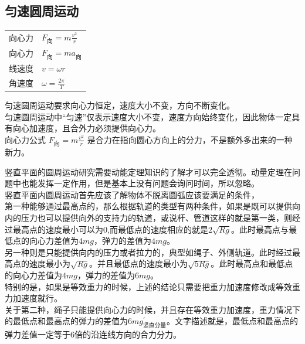 \subsection{匀速圆周运动}
\begin{tabularx}{\columnwidth}{XX}
  向心力 & $F_{\text{向}}=m\frac{v^2}{r}$ \\
  向心力 & $F_{\text{向}}=ma_{\text{向}}$\\
  线速度 & $v=\omega r$\\
  角速度 & $\omega=\frac{2\pi}{T}$ \\
\end{tabularx}

\begin{formulanotebox}
  匀速圆周运动要求向心力恒定，速度大小不变，方向不断变化。\\
  匀速圆周运动中“匀速”仅表示速度大小不变，速度方向始终变化，因此物体一定具有向心加速度，且合外力必须提供向心力。\\
  向心力公式 $F_{\text{向}}=m\frac{v^2}{r}$ 是合力在指向圆心方向上的分力，不是额外多出来的一种新力。
\end{formulanotebox}

\begin{casetypebox}[title={\strut\textcolor{white}{\bfseries 常见题型：竖直平面圆周运动}}]
  竖直平面的圆周运动研究需要动能定理知识的了解才可以完全透彻。动量定理在问题中也能发挥一定作用，但是基本上没有问题会询问时间，所以忽略。\\
  竖直平面内圆周运动首先应该了解物体不脱离圆弧应该要满足的条件，\\

  第一种能够通过最高点的，那么根据轨道的类型有两种条件，如果是既可以提供向内的压力也可以提供向外的支持力的轨道，或说杆、管道这样的就是第一类，则经过最高点的速度最小可以为0,而最低点的速度相应的就是$2\sqrt{Rg}$。此时最高点与最低点的向心力差值为$4mg$，弹力的差值为$4mg$。\\

  另一种则是只能提供向内的压力或者拉力的，典型如绳子、外侧轨道。此时经过最高点的速度最小为$\sqrt{Rg}$。并且最低点的速度最小为$\sqrt{5Rg}$。此时最高点和最低点的向心力差值为$4mg$，弹力的差值为$6mg$。\\

  特别的是，如果是等效重力的时候，上述的结论只需要把重力加速度修改成等效重力加速度就行。\\
  关于第二种，绳子只能提供向心力的时候，并且存在等效重力加速度，重力情况下的最低点和最高点的弹力的差值为$6mg^{'}_{\text{竖直分量}}$。文字描述就是，最低点和最高点的弹力差值一定等于6倍的沿连线方向的合力分力。
\end{casetypebox}

